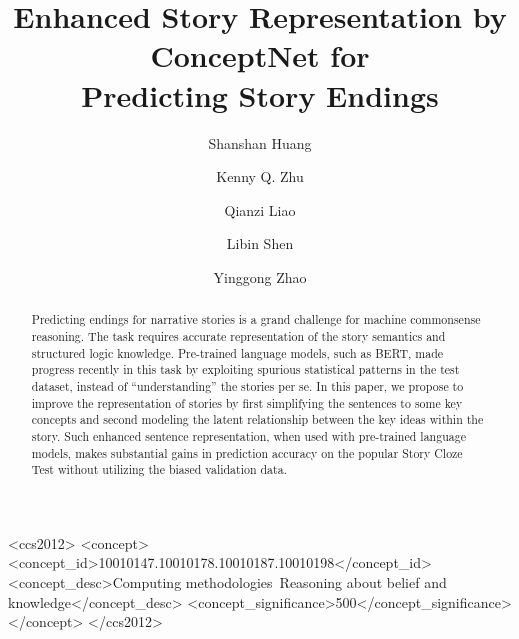 \documentclass[sigconf]{acmart}
\begin{document}
\fancyhead{}
\title{Enhanced Story Representation by ConceptNet for\\
Predicting Story Endings}


\author{Shanshan Huang}
\author{Kenny Q. Zhu}

\author{Qianzi Liao}

\author{Libin Shen}
\author{Yinggong Zhao}



\renewcommand{\shortauthors}{Trovato and Tobin, et al.}

\begin{abstract}
Predicting endings for narrative stories is a grand challenge for
machine commonsense reasoning. The task requires accurate representation of
the story semantics and structured logic knowledge. 
Pre-trained language models, such as BERT, made progress recently in
this task by exploiting spurious statistical patterns in the
test dataset, instead of ``understanding'' the stories per se.  
In this paper, we propose to improve the representation
of stories by first simplifying the sentences to some key concepts
and second modeling the latent relationship between the key ideas within the story.
Such enhanced sentence representation, when used with pre-trained language models, 
makes substantial gains in prediction accuracy on the popular Story
Cloze Test without utilizing the biased validation data. 
\end{abstract}
\begin{CCSXML}
<ccs2012>
   <concept>
       <concept_id>10010147.10010178.10010187.10010198</concept_id>
       <concept_desc>Computing methodologies~Reasoning about belief and knowledge</concept_desc>
       <concept_significance>500</concept_significance>
       </concept>
 </ccs2012>
\end{CCSXML}
\end{document}
